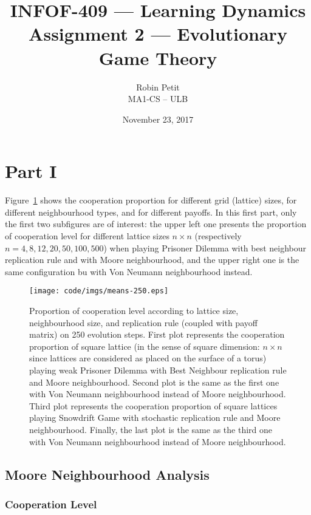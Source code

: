 \documentclass{article}
\title{INFOF-409 --- Learning Dynamics\\ Assignment 2 --- Evolutionary Game Theory}
\author{Robin Petit\\ MA1-CS -- ULB}
\date{November 23, 2017}
\begin{document}
\maketitle
\tableofcontents
\newpage
{}
\setcounter{page}{1}

\section{Part I}

Figure~\ref{fig:coop proportion} shows the cooperation proportion for different grid (lattice) sizes,
for different neighbourhood types, and for different payoffs. In this first part, only the first two
subfigures are of interest: the upper left one presents the proportion of cooperation level for
different lattice sizes $n \times n$ (respectively $n=4,8,12,20,50,100,500$) when playing Prisoner
Dilemma with best neighbour replication rule and with Moore neighbourhood, and the upper right one
is the same configuration bu with Von Neumann neighbourhood instead.

\begin{figure}[!b]
\hspace{-2.5cm}
\vspace{-.7cm}
\texttt{[image: code/imgs/means-250.eps]}
\caption{Proportion of cooperation level according to lattice size, neighbourhood size, and replication
rule (coupled with payoff matrix) on 250 evolution steps. First plot represents the cooperation
proportion of square lattice (in the sense of square dimension: $n \times n$ since lattices are
considered as placed on the surface of a torus) playing weak Prisoner Dilemma with Best Neighbour
replication rule and Moore neighbourhood. Second plot is the same as the first one with Von Neumann
neighbourhood instead of Moore neighbourhood. Third plot represents the cooperation proportion of
square lattices playing Snowdrift Game with stochastic replication rule and Moore neighbourhood.
Finally, the last plot is the same as the third one with Von Neumann neighbourhood instead of Moore
neighbourhood.
\label{fig:coop proportion}}
\end{figure}

\subsection{Moore Neighbourhood Analysis}

\subsubsection{Cooperation Level}
\end{document}
